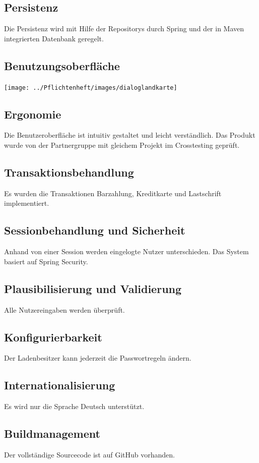 \documentclass[pdftex,12pt,a4paper]{article}
\begin{document}
\subsection{Persistenz}
Die Persistenz wird mit Hilfe der Repositorys durch Spring und der in Maven integrierten Datenbank geregelt.

\subsection{Benutzungsoberfläche}
\texttt{[image: ../Pflichtenheft/images/dialoglandkarte]}

\subsection{Ergonomie}
Die Benutzeroberfl\"ache ist intuitiv gestaltet und leicht verst\"andlich.
Das Produkt wurde von der Partnergruppe mit gleichem Projekt im Crosstesting gepr\"uft.
\subsection{Transaktionsbehandlung}
Es wurden die Transaktionen Barzahlung, Kreditkarte und Lastschrift implementiert.

\subsection{Sessionbehandlung und Sicherheit}
Anhand von einer Session werden eingelogte Nutzer unterschieden. Das System basiert auf Spring Security.

\subsection{Plausibilisierung und Validierung}
Alle Nutzereingaben werden \"uberpr\"uft.

\subsection{Konfigurierbarkeit}
Der Ladenbesitzer kann jederzeit die Passwortregeln \"andern.

\subsection{Internationalisierung}
Es wird nur die Sprache Deutsch unterst\"utzt.

\subsection{Buildmanagement}
Der vollst\"andige Sourcecode ist auf GitHub vorhanden.
\end{document}
